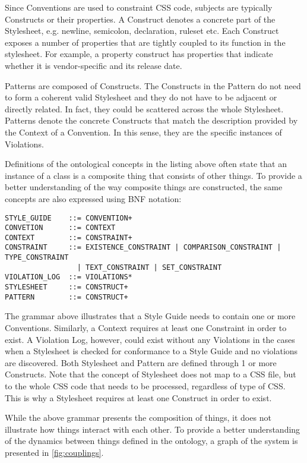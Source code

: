 Since Conventions are used to constraint CSS code, subjects are typically Constructs or their
properties. A Construct denotes a concrete part of the Stylesheet, e.g. newline, semicolon,
declaration, ruleset etc. Each Construct exposes a number of properties that are tightly coupled to
its function in the stylesheet. For example, a property construct has properties
that indicate whether it is vendor-specific and its release date.

Patterns are composed of Constructs. The Constructs in the Pattern do not need to form a coherent
valid Stylesheet and they do not have to be adjacent or directly related. In fact, they could be
scattered across the whole Stylesheet. Patterns denote the concrete Constructs that match the
description provided by the Context of a Convention. In this sense, they are the specific instances
of Violations.

Definitions of the ontological concepts in the listing above often state that an instance of a
class is a composite thing that consists of other things. To provide a better understanding of the
way composite things are constructed, the same concepts are also expressed using BNF notation:

\begin{snippet}
\begin{verbatim}
STYLE_GUIDE    ::= CONVENTION+
CONVETION      ::= CONTEXT
CONTEXT        ::= CONSTRAINT+
CONSTRAINT     ::= EXISTENCE_CONSTRAINT | COMPARISON_CONSTRAINT | TYPE_CONSTRAINT  
                 | TEXT_CONSTRAINT | SET_CONSTRAINT
VIOLATION_LOG  ::= VIOLATIONS*
STYLESHEET     ::= CONSTRUCT+
PATTERN        ::= CONSTRUCT+
\end{verbatim}
\end{snippet}

The grammar above illustrates that a Style Guide needs to contain one or more Conventions.
Similarly, a Context requires at least one Constraint in order to exist. A Violation Log, however,
could exist without any Violations in the cases when a Stylesheet is checked for conformance to a
Style Guide and no violations are discovered. Both Stylesheet and Pattern are defined through 1 or
more Constructs. Note that the concept of Stylesheet does not map to a CSS file, but to the whole
CSS code that needs to be processed, regardless of type of CSS. This is why a Stylesheet requires at
least one Construct in order to exist.

While the above grammar presents the composition of things, it does not illustrate how things
interact with each other. To provide a better understanding of the dynamics between things defined
in the ontology, a graph of the system is presented in \autoref{fig:couplings}.

